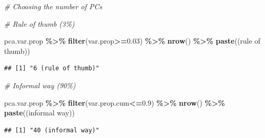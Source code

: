 \documentclass[
]{article}
\newenvironment{Shaded}{\begin{snugshade}}{\end{snugshade}}
\newcommand{\CommentTok}[1]{\textcolor[rgb]{0.56,0.35,0.01}{\textit{#1}}}
\newcommand{\DecValTok}[1]{\textcolor[rgb]{0.00,0.00,0.81}{#1}}
\newcommand{\FloatTok}[1]{\textcolor[rgb]{0.00,0.00,0.81}{#1}}
\newcommand{\FunctionTok}[1]{\textcolor[rgb]{0.13,0.29,0.53}{\textbf{#1}}}
\newcommand{\NormalTok}[1]{#1}
\newcommand{\SpecialCharTok}[1]{\textcolor[rgb]{0.81,0.36,0.00}{\textbf{#1}}}
\newcommand{\StringTok}[1]{\textcolor[rgb]{0.31,0.60,0.02}{#1}}
\begin{document}
\begin{Shaded}
\begin{Highlighting}[]
\CommentTok{\# Choosing the number of PCs}

\CommentTok{\# Rule of thumb (3\%)}

\NormalTok{pca.var.prop }\SpecialCharTok{\%\textgreater{}\%}
  \FunctionTok{filter}\NormalTok{(var.prop}\SpecialCharTok{\textgreater{}=}\FloatTok{0.03}\NormalTok{) }\SpecialCharTok{\%\textgreater{}\%}
  \FunctionTok{nrow}\NormalTok{() }\SpecialCharTok{\%\textgreater{}\%}
  \FunctionTok{paste}\NormalTok{(}\StringTok{\textquotesingle{}(rule of thumb)\textquotesingle{}}\NormalTok{)}
\end{Highlighting}
\end{Shaded}

\begin{verbatim}
## [1] "6 (rule of thumb)"
\end{verbatim}

\begin{Shaded}
\begin{Highlighting}[]
\CommentTok{\# Informal way (90\%)}

\NormalTok{pca.var.prop }\SpecialCharTok{\%\textgreater{}\%}
  \FunctionTok{filter}\NormalTok{(var.prop.cum}\SpecialCharTok{\textless{}=}\FloatTok{0.9}\NormalTok{) }\SpecialCharTok{\%\textgreater{}\%}
  \FunctionTok{nrow}\NormalTok{() }\SpecialCharTok{\%\textgreater{}\%}
  \FunctionTok{paste}\NormalTok{(}\StringTok{\textquotesingle{}(informal way)\textquotesingle{}}\NormalTok{)}
\end{Highlighting}
\end{Shaded}

\begin{verbatim}
## [1] "40 (informal way)"
\end{verbatim}

\begin{Shaded}
\end{Shaded}
\end{document}
